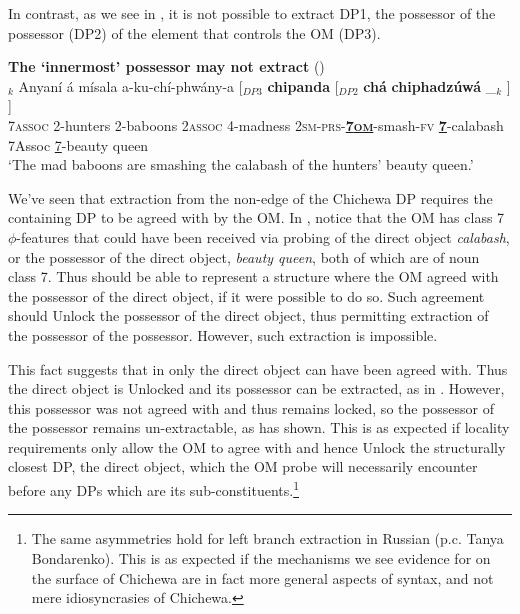 \documentclass[output=paper,colorlinks,citecolor=brown]{langscibook}
\begin{document}
In contrast, as we see in , it is not possible to extract DP1, the possessor of the possessor (DP2) of the element that controls the OM (DP3).

\ea%
    \label{ex:branan:16}
    \textbf{The `innermost' possessor may not extract} \hfill{(\citealt[61, ex. 32]{Mchombo2004})}\\
    $_{k}$  Anyaní á mísala a-ku-chí-phwány-a [$_{DP3}$ \textbf{chipanda}  [$_{DP2}$ \textbf{chá}  \textbf{chiphadz\'{u}w\'{a}} \_$_{k}$ ] ]  \\
            {} 7\textsc{assoc} 2-hunters   2-baboons 2\textsc{assoc} 4-madness 2\textsc{sm-prs}-\textbf{\underline{7\textsc{om}}}-smash-\textsc{fv} {} \textbf{\underline{7}}-calabash {} 7Assoc {\underline{7}-beauty queen} {} {} {}  \\
    \glt    `The mad baboons are smashing the calabash of the hunters’ beauty queen.'
\z

We've seen that extraction from the non-edge of the Chichewa DP requires the containing DP to be agreed with by the OM. In , notice that the OM has class 7 $\phi$-features that could have been received via probing of the direct object \textit{calabash}, or the possessor of the direct object, \textit{beauty queen}, both of which are of noun class 7. Thus  should be able to represent a structure where the OM agreed with the possessor of the direct object, if it were possible to do so. Such agreement should Unlock the possessor of the direct object, thus permitting extraction of the possessor of the possessor. However, such extraction is impossible.


This fact suggests that in  only the direct object can have been agreed with. Thus the direct object is Unlocked and its possessor can be extracted, as in . However, this possessor was not agreed with and thus remains locked, so the possessor of the possessor remains un-extractable, as  has shown. This is as expected if locality requirements only allow the OM to agree with and hence Unlock the structurally closest DP, the direct object, which the OM probe will necessarily encounter before any DPs which are its sub-constituents.\footnote{The same asymmetries hold for left branch extraction in Russian (p.c. Tanya Bondarenko). This is as expected if the mechanisms we see evidence for on the surface of Chichewa are in fact more general aspects of syntax, and not mere idiosyncrasies of Chichewa.}
\end{document}
